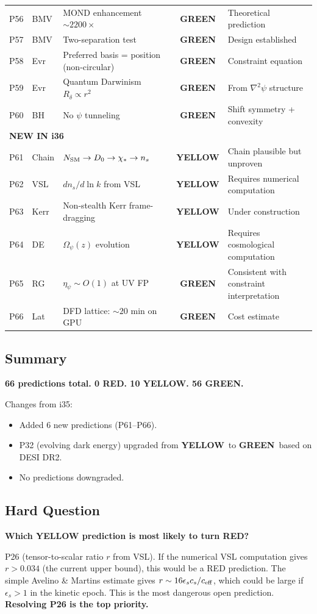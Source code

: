 \documentclass[11pt,a4paper]{article}
\newcommand{\GREEN}{\textcolor{dfdgreen}{\textbf{GREEN}}}
\newcommand{\YELLOW}{\textcolor{dfdyellow}{\textbf{YELLOW}}}
\begin{document}
\begin{center}
\begin{longtable}{clp{5.5cm}cl}
P56 & BMV & MOND enhancement $\sim 2200\times$ & \GREEN & Theoretical prediction \\
P57 & BMV & Two-separation test & \GREEN & Design established \\
P58 & Evr & Preferred basis = position (non-circular) & \GREEN & Constraint equation \\
P59 & Evr & Quantum Darwinism $R_\delta \propto r^2$ & \GREEN & From $\nabla^2\psi$ structure \\
P60 & BH & No $\psi$ tunneling & \GREEN & Shift symmetry + convexity \\
\midrule
\multicolumn{5}{l}{\textbf{NEW IN i36}} \\
\midrule
P61 & Chain & $N_{\rm SM} \to D_0 \to \chi_* \to n_s$ & \YELLOW & Chain plausible but unproven \\
P62 & VSL & $dn_s/d\ln k$ from VSL & \YELLOW & Requires numerical computation \\
P63 & Kerr & Non-stealth Kerr frame-dragging & \YELLOW & Under construction \\
P64 & DE & $\Omega_\psi(z)$ evolution & \YELLOW & Requires cosmological computation \\
P65 & RG & $\eta_\psi \sim O(1)$ at UV FP & \GREEN & Consistent with constraint interpretation \\
P66 & Lat & DFD lattice: $\sim 20$ min on GPU & \GREEN & Cost estimate \\
\bottomrule
\end{longtable}
\end{center}

\subsection{Summary}

\textbf{66 predictions total. 0 RED. 10 YELLOW. 56 GREEN.}

Changes from i35:
\begin{itemize}
\item Added 6 new predictions (P61--P66).
\item P32 (evolving dark energy) upgraded from \YELLOW\ to \GREEN\ based on DESI DR2.
\item No predictions downgraded.
\end{itemize}

\subsection{Hard Question}

\textbf{Which YELLOW prediction is most likely to turn RED?}

P26 (tensor-to-scalar ratio $r$ from VSL). If the numerical VSL computation gives $r > 0.034$ (the current upper bound), this would be a RED prediction. The simple Avelino \& Martins estimate gives $r \sim 16\epsilon_s c_s/c_{\rm eff}$, which could be large if $\epsilon_s > 1$ in the kinetic epoch. This is the most dangerous open prediction. \textbf{Resolving P26 is the top priority.}
\end{document}
